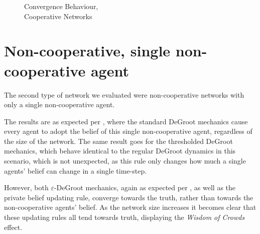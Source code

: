 \documentclass[a4paper, 12pt]{report}
\begin{document}
\begin{figure}[!htbp]
\begin{minipage}{.45\linewidth}
    \end{minipage}\par\medskip
    \centering
    
    \caption{Convergence Behaviour, \\ Cooperative Networks }
\end{figure}

\newpage

\section{Non-cooperative, single non-cooperative agent}
\label{results:noncoop1}
The second type of network we evaluated were non-cooperative networks with only a single non-cooperative agent.

The results are as expected per \cite{amir2021robust}, where the standard DeGroot mechanics cause every agent to adopt the belief of this single non-cooperative agent, regardless of the size of the network. The same result goes for the thresholded DeGroot mechanics, which behave identical to the regular DeGroot dynamics in this scenario, which is not unexpected, as this rule only changes how much a single agents' belief can change in a single time-step.

However, both $\varepsilon$-DeGroot mechanics, again as expected per \cite{amir2021robust}, as well as the private belief updating rule, converge towards the truth, rather than towards the non-cooperative agents' belief. As the network size increases it becomes clear that these updating rules all tend towards truth, displaying the \emph{Wisdom of Crowds} effect.
\end{document}
